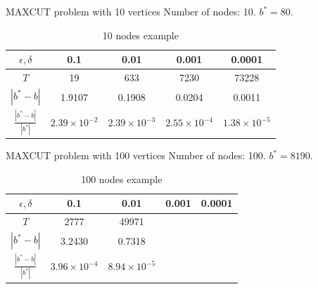 \documentclass{beamer}
\begin{document}
\begin{frame}{MAXCUT problem with 10 vertices}
Number of nodes: 10. $b^* = 80$. 
\begin{table}[htbp]\label{10nodestable}
\centering\small

\begin{tabular}{||c|c|c|c|c||}
\hline
$\epsilon, \delta$ & 0.1 & 0.01 & 0.001 & 0.0001 \\
\hline
$T$ & 19 & 633 & 7230 & 73228 \\
\hline
$|b^* - b|$ & 1.9107 & 0.1908 & 0.0204 & 0.0011 \\
\hline
$\frac{|b^* - b|}{|b^*|}$ & $2.39\times 10^{-2}$ &  $2.39\times 10^{-3}$  & $2.55\times 10^{-4}$ &  $1.38\times 10^{-5}$\\
\hline
\end{tabular}
\caption{10 nodes example}
\end{table}
\end{frame}

\begin{frame}{MAXCUT problem with 100 vertices}
Number of nodes: 100. $b^* = 8190$. 
\begin{table}[htbp]\label{100nodestable}
\centering
\begin{tabular}{||c|c|c|c|c||}
\hline
$\epsilon, \delta$ & 0.1 & 0.01 & 0.001 & 0.0001 \\
\hline
$T$ & 2777 & 49971 &  & \\
\hline
$|b^* - b|$ & 3.2430 & 0.7318 &  & \\
\hline
$\frac{|b^* - b|}{|b^*|}$ & $3.96\times 10^{-4}$  & $8.94\times 10^{-5}$ & & \\
\hline
\end{tabular}
\caption{100 nodes example}
\end{table}

\end{frame}
\end{document}
